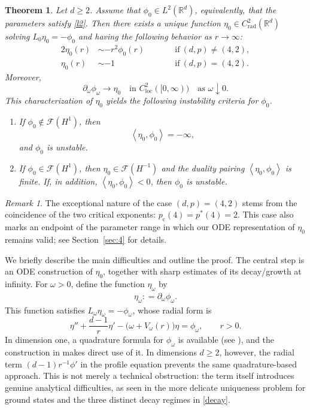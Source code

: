 \documentclass[12pt, a4paper, reqno]{amsart}
\numberwithin{equation}{section}
\newtheorem{theorem}{Theorem}[section]
\theoremstyle{definition}
\theoremstyle{remark}
\newtheorem*{remark*}{Remark}
\newcommand{\R}{\mathbb R}
\newcommand{\cF}{\mathcal F}
\def\tbra[#1,#2]{{\left\langle #1,#2\right\rangle}}
\newcommand{\rad}{\mathrm{rad}}
\newcommand{\pt}{\partial}
\newcommand{\ce}{\mathrel{\mathop:}=}
\begin{document}
\begin{theorem}\label{thm:ode}
Let $d\ge2$. Assume that $\phi_0\in L^2(\R^d)$, equivalently, that the parameters
satisfy \eqref{l2}. Then there exists a unique function
$\eta_0\in C_{\rad}^2(\R^d)$ solving $L_0\eta_0=-\phi_0$ and having
the following behavior as $r\to\infty$:
\begin{alignat*}{2}
  \eta_0(r)&\sim-r^2\phi_0(r) &\qquad &\text{if}~(d,p)\ne(4,2),\\
  \eta_0(r)&\sim-1 &&\text{if}~(d,p)=(4,2).
\end{alignat*}
Moreover,
\[
  \pt_\omega\phi_\omega\to\eta_0
  \quad\text{in }C_{\mathrm{loc}}^2([0,\infty))
  \quad\text{as }\omega\downarrow0.
\]
This characterization of $\eta_0$ yields the following
instability criteria for $\phi_0$.
\begin{enumerate}
\item If $\phi_0\notin\cF(H^1)$, then
\[
  \tbra[\eta_0,\phi_0]=-\infty,
\]
and $\phi_0$ is unstable.

\item If $\phi_0\in\cF(H^1)$, then
$\eta_0\in\cF(H^{-1})$ and the duality pairing $\tbra[\eta_0,\phi_0]$
is finite. If, in addition, $\tbra[\eta_0,\phi_0]<0$, then $\phi_0$ is unstable.
\end{enumerate}
\end{theorem}

\begin{remark*}
The exceptional nature of the case $(d,p)=(4,2)$ stems from the coincidence of the two critical exponents: $p_{\mathrm c}(4)=p^*(4)=2$. This case also marks an endpoint of the parameter range in which our ODE representation of $\eta_0$ remains valid; see Section~\ref{sec:4} for details.
\end{remark*}

We briefly describe the main difficulties and outline the proof.
The central step is an ODE construction of $\eta_0$, together with
sharp estimates of its decay/growth at infinity. For
$\omega>0$, define the function $\eta_\omega$ by 
\begin{align*}
\eta_\omega\ce\pt_\omega\phi_\omega.
\end{align*}
This function satisfies $L_\omega\eta_\omega=-\phi_\omega$, whose radial form is
\begin{equation}\label{inhom-ode}
  \eta''+\frac{d-1}{r}\eta'
  -\bigl(\omega+V_\omega(r)\bigr)\eta=\phi_\omega,
  \qquad r>0.
\end{equation}
In dimension one, a quadrature formula for $\phi_\omega$ is available (see \cite{IK93}), and the construction in \cite{FH25} makes direct use of it. In dimensions $d\ge2$, however, the radial term $(d-1)r^{-1}\phi'$ in the profile equation prevents the same quadrature-based approach. This is not merely a technical obstruction: the term itself introduces genuine analytical difficulties, as seen in the more delicate uniqueness problem for ground states and the three distinct decay regimes in \eqref{decay}. 
\end{document}
